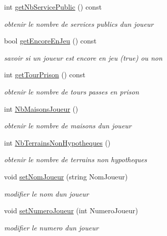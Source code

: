 \begin{DoxyCompactItemize}
int \hyperlink{classJoueur_a92e50af7b49e96d048b75a3114a16f87}{get\+Nb\+Service\+Public} () const 
\begin{DoxyCompactList}\small\item\em obtenir le nombre de services publics d\textquotesingle{}un joueur \end{DoxyCompactList}\item 
bool \hyperlink{classJoueur_a84ce42b1f0c45d71de434de8923318e7}{get\+Encore\+En\+Jeu} () const 
\begin{DoxyCompactList}\small\item\em savoir si un joueur est encore en jeu (true) ou non \end{DoxyCompactList}\item 
int \hyperlink{classJoueur_a2c72233b506965c4725d9941b60a6f6a}{get\+Tour\+Prison} () const 
\begin{DoxyCompactList}\small\item\em obtenir le nombre de tours passes en prison \end{DoxyCompactList}\item 
int \hyperlink{classJoueur_aa9ecdb286b9a2c293fb65f20c169c1c8}{Nb\+Maisons\+Joueur} ()
\begin{DoxyCompactList}\small\item\em obtenir le nombre de maisons d\textquotesingle{}un joueur \end{DoxyCompactList}\item 
int \hyperlink{classJoueur_a42907f6de094a06ced56018c48389d2c}{Nb\+Terrains\+Non\+Hypotheques} ()
\begin{DoxyCompactList}\small\item\em obtenir le nombre de terrains non hypotheques \end{DoxyCompactList}\item 
void \hyperlink{classJoueur_a621f031b62d9a5a2360c7ecbe87963e8}{set\+Nom\+Joueur} (string Nom\+Joueur)
\begin{DoxyCompactList}\small\item\em modifier le nom d\textquotesingle{}un joueur \end{DoxyCompactList}\item 
void \hyperlink{classJoueur_a50820633156f35216a2591f66bab2f7b}{set\+Numero\+Joueur} (int Numero\+Joueur)
\begin{DoxyCompactList}\small\item\em modifier le numero d\textquotesingle{}un joueur \end{DoxyCompactList}\item 

\end{DoxyCompactItemize}
